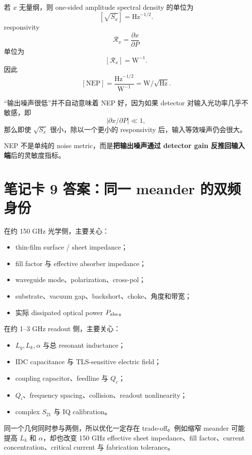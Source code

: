 \documentclass[11pt,a4paper,openany]{ctexrep}
\begin{document}
若 $x$ 无量纲，则 one-sided amplitude spectral density 的单位为
\[
[\sqrt{S_x}]=\mathrm{Hz}^{-1/2}.
\]
responsivity
\[
\mathcal R_x=\frac{\partial x}{\partial P}
\]
单位为
\[
[\mathcal R_x]=\mathrm{W}^{-1}.
\]
因此
\[
[\mathrm{NEP}]
=\frac{\mathrm{Hz}^{-1/2}}{\mathrm{W}^{-1}}
=\boxed{\mathrm{W}/\sqrt{\mathrm{Hz}}}.
\]

“输出噪声很低”并不自动意味着 NEP 好，因为如果 detector 对输入光功率几乎不敏感，即
\[
|\partial x/\partial P|\ll1,
\]
那么即使 $\sqrt{S_x}$ 很小，除以一个更小的 responsivity 后，输入等效噪声仍会很大。

\begin{answerbox}[title=一句话]
NEP 不是单纯的 noise metric，而是\textbf{把输出噪声通过 detector gain 反推回输入端}后的灵敏度指标。
\end{answerbox}

\section{笔记卡 9 答案：同一 meander 的双频身份}

在约 150 GHz 光学侧，主要关心：
\begin{itemize}
  \item thin-film surface / sheet impedance；
  \item fill factor 与 effective absorber impedance；
  \item waveguide mode、polarization、cross-pol；
  \item substrate、vacuum gap、backshort、choke、角度和带宽；
  \item 实际 dissipated optical power $P_{\rm abs}$。
\end{itemize}

在约 1--3 GHz readout 侧，主要关心：
\begin{itemize}
  \item $L_g,L_k,\alpha$ 与总 resonant inductance；
  \item IDC capacitance 与 TLS-sensitive electric field；
  \item coupling capacitor、feedline 与 $Q_c$；
  \item $Q_i$、frequency spacing、collision、readout nonlinearity；
  \item complex $S_{21}$ 与 IQ calibration。
\end{itemize}

同一个几何同时参与两侧，所以优化一定存在 trade-off。例如缩窄 meander 可能提高 $L_k$ 和 $\alpha$，却也改变 150 GHz effective sheet impedance、fill factor、current concentration、critical current 与 fabrication tolerance。
\end{document}
